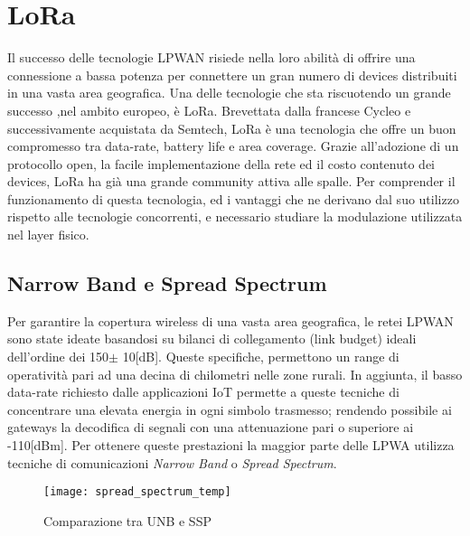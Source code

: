 \chapter{LoRa}
Il successo delle tecnologie LPWAN risiede nella loro abilità di offrire una
connessione a bassa potenza per connettere un gran numero di  devices distribuiti in una
vasta area geografica. 
Una delle  tecnologie che sta riscuotendo un grande successo ,nel
ambito europeo, è LoRa.
Brevettata dalla francese Cycleo e successivamente acquistata da Semtech, LoRa è
una tecnologia che offre un buon compromesso tra data-rate,
battery life e area coverage.
Grazie all'adozione di un protocollo open, la facile implementazione della rete
ed il costo contenuto dei devices, LoRa ha già una grande community attiva alle
spalle. Per comprender il funzionamento di questa tecnologia, ed i vantaggi che ne
derivano dal suo utilizzo rispetto alle tecnologie concorrenti, e necessario
studiare la modulazione utilizzata nel layer fisico.

\section{Narrow Band e Spread Spectrum}
Per garantire la copertura wireless di una vasta area geografica, le retei LPWAN 
sono state ideate basandosi su  bilanci di
collegamento (link budget) ideali  dell'ordine dei 150$\pm$ 10[dB]. 
Queste specifiche, permettono  un range di operatività
pari ad una decina di chilometri nelle zone rurali. 
In aggiunta, il basso data-rate richiesto dalle applicazioni IoT permette a
queste tecniche di concentrare una elevata energia in
ogni simbolo trasmesso; rendendo possibile ai gateways la decodifica di 
segnali con una attenuazione pari o superiore ai -110[dBm]. Per ottenere queste
prestazioni la maggior parte delle LPWA utilizza tecniche di comunicazioni
\emph{Narrow Band} o \emph{Spread Spectrum}.

\begin{figure}[h]
\centering 
\texttt{[image: spread\_spectrum\_temp]}
\caption{Comparazione tra UNB e SSP}
\end{figure}

